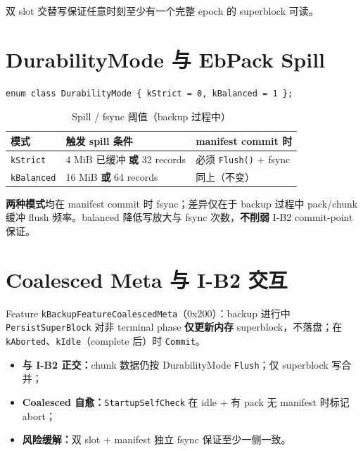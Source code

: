 双 slot 交替写保证任意时刻至少有一个完整 epoch 的 superblock 可读。

\section{DurabilityMode 与 EbPack Spill}

\begin{lstlisting}[caption={DurabilityMode（\filepath{chunk\_store.h}）},label={lst:durability}]
enum class DurabilityMode { kStrict = 0, kBalanced = 1 };
\end{lstlisting}

\begin{table}[htbp]
\centering
\caption{Spill / fsync 阈值（backup 过程中）}
\begin{tabular}{@{}lll@{}}
\toprule
模式 & 触发 spill 条件 & manifest commit 时 \\
\midrule
\texttt{kStrict} & 4 MiB 已缓冲 \textbf{或} 32 records & 必须 \texttt{Flush()} + fsync \\
\texttt{kBalanced} & 16 MiB \textbf{或} 64 records & 同上（不变） \\
\bottomrule
\end{tabular}
\end{table}

\begin{designbox}[v0.4.6+ 语义澄清]
\textbf{两种模式}均在 manifest commit 时 fsync；差异仅在于 backup 过程中 pack/chunk 缓冲 flush 频率。balanced 降低写放大与 fsync 次数，\textbf{不削弱} I-B2 commit-point 保证。
\end{designbox}

\section{Coalesced Meta 与 I-B2 交互}

Feature \texttt{kBackupFeatureCoalescedMeta}（0x200）：backup 进行中 \texttt{PersistSuperBlock} 对非 terminal phase \textbf{仅更新内存} superblock，不落盘；在 \texttt{kAborted}、\texttt{kIdle}（complete 后）时 \texttt{Commit}。

\begin{itemize}[nosep]
  \item \textbf{与 I-B2 正交：}chunk 数据仍按 DurabilityMode \texttt{Flush}；仅 superblock 写合并；
  \item \textbf{Coalesced 自愈：}\texttt{StartupSelfCheck} 在 idle + 有 pack 无 manifest 时标记 abort；
  \item \textbf{风险缓解：}双 slot + manifest 独立 fsync 保证至少一侧一致。
\end{itemize}


